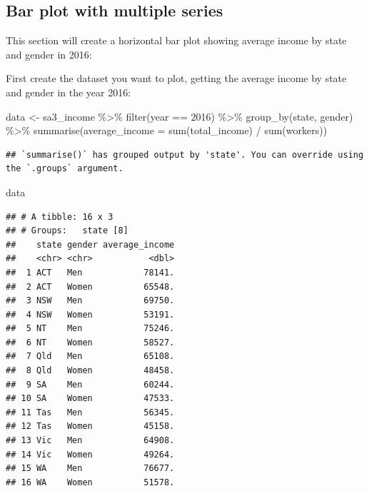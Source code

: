 \documentclass[
]{book}
\newenvironment{Shaded}{\begin{snugshade}}{\end{snugshade}}
\newcommand{\AttributeTok}[1]{\textcolor[rgb]{0.77,0.63,0.00}{#1}}
\newcommand{\DecValTok}[1]{\textcolor[rgb]{0.00,0.00,0.81}{#1}}
\newcommand{\FunctionTok}[1]{\textcolor[rgb]{0.00,0.00,0.00}{#1}}
\newcommand{\NormalTok}[1]{#1}
\newcommand{\OtherTok}[1]{\textcolor[rgb]{0.56,0.35,0.01}{#1}}
\newcommand{\SpecialCharTok}[1]{\textcolor[rgb]{0.00,0.00,0.00}{#1}}
\begin{document}
\hypertarget{bar-multi}{%
\subsection{Bar plot with multiple series}\label{bar-multi}}

This section will create a horizontal bar plot showing average income by state and gender in 2016:

First create the dataset you want to plot, getting the average income by state and gender in the year 2016:

\begin{Shaded}
\begin{Highlighting}[]
\NormalTok{data }\OtherTok{\textless{}{-}}\NormalTok{ sa3\_income }\SpecialCharTok{\%\textgreater{}\%} 
  \FunctionTok{filter}\NormalTok{(year }\SpecialCharTok{==} \DecValTok{2016}\NormalTok{) }\SpecialCharTok{\%\textgreater{}\%}   
  \FunctionTok{group\_by}\NormalTok{(state, gender) }\SpecialCharTok{\%\textgreater{}\%}   
  \FunctionTok{summarise}\NormalTok{(}\AttributeTok{average\_income =} \FunctionTok{sum}\NormalTok{(total\_income) }\SpecialCharTok{/} \FunctionTok{sum}\NormalTok{(workers))}
\end{Highlighting}
\end{Shaded}

\begin{verbatim}
## `summarise()` has grouped output by 'state'. You can override using the `.groups` argument.
\end{verbatim}

\begin{Shaded}
\begin{Highlighting}[]
\NormalTok{data}
\end{Highlighting}
\end{Shaded}

\begin{verbatim}
## # A tibble: 16 x 3
## # Groups:   state [8]
##    state gender average_income
##    <chr> <chr>           <dbl>
##  1 ACT   Men            78141.
##  2 ACT   Women          65548.
##  3 NSW   Men            69750.
##  4 NSW   Women          53191.
##  5 NT    Men            75246.
##  6 NT    Women          58527.
##  7 Qld   Men            65108.
##  8 Qld   Women          48458.
##  9 SA    Men            60244.
## 10 SA    Women          47533.
## 11 Tas   Men            56345.
## 12 Tas   Women          45158.
## 13 Vic   Men            64908.
## 14 Vic   Women          49264.
## 15 WA    Men            76677.
## 16 WA    Women          51578.
\end{verbatim}
\end{document}
